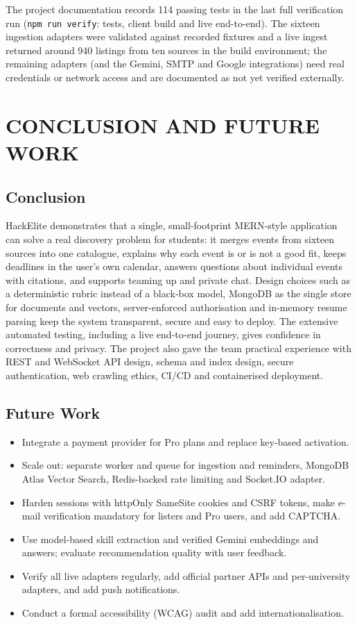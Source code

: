\documentclass[12pt,a4paper]{report}
\begin{document}
The project documentation records 114 passing tests in the last full verification run (\texttt{npm run verify}: tests, client build and live end-to-end). The sixteen ingestion adapters were validated against recorded fixtures and a live ingest returned around 940 listings from ten sources in the build environment; the remaining adapters (and the Gemini, SMTP and Google integrations) need real credentials or network access and are documented as not yet verified externally.

\chapter{CONCLUSION AND FUTURE WORK}

\section{Conclusion}
HackElite demonstrates that a single, small-footprint MERN-style application can solve a real discovery problem for students: it merges events from sixteen sources into one catalogue, explains why each event is or is not a good fit, keeps deadlines in the user's own calendar, answers questions about individual events with citations, and supports teaming up and private chat. Design choices such as a deterministic rubric instead of a black-box model, MongoDB as the single store for documents and vectors, server-enforced authorisation and in-memory resume parsing keep the system transparent, secure and easy to deploy. The extensive automated testing, including a live end-to-end journey, gives confidence in correctness and privacy. The project also gave the team practical experience with REST and WebSocket API design, schema and index design, secure authentication, web crawling ethics, CI/CD and containerised deployment.

\section{Future Work}
\begin{itemize}[leftmargin=*]
    \item Integrate a payment provider for Pro plans and replace key-based activation.
    \item Scale out: separate worker and queue for ingestion and reminders, MongoDB Atlas Vector Search, Redis-backed rate limiting and Socket.IO adapter.
    \item Harden sessions with httpOnly SameSite cookies and CSRF tokens, make e-mail verification mandatory for listers and Pro users, and add CAPTCHA.
    \item Use model-based skill extraction and verified Gemini embeddings and answers; evaluate recommendation quality with user feedback.
    \item Verify all live adapters regularly, add official partner APIs and per-university adapters, and add push notifications.
    \item Conduct a formal accessibility (WCAG) audit and add internationalisation.
\end{itemize}
\end{document}
